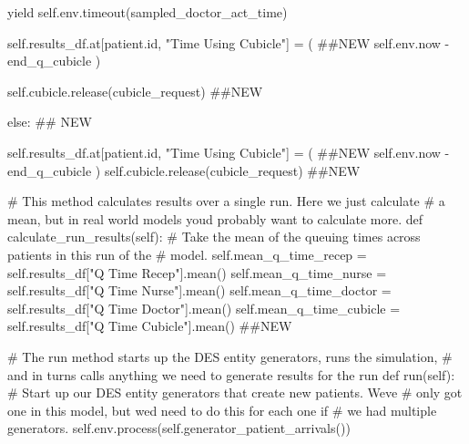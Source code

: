 \documentclass[
  letterpaper,
  DIV=11,
  numbers=noendperiod]{scrreprt}
\newenvironment{Shaded}{\begin{snugshade}}{\end{snugshade}}
\newcommand{\BuiltInTok}[1]{\textcolor[rgb]{0.00,0.23,0.31}{#1}}
\newcommand{\CommentTok}[1]{\textcolor[rgb]{0.37,0.37,0.37}{#1}}
\newcommand{\ControlFlowTok}[1]{\textcolor[rgb]{0.00,0.23,0.31}{#1}}
\newcommand{\KeywordTok}[1]{\textcolor[rgb]{0.00,0.23,0.31}{#1}}
\newcommand{\NormalTok}[1]{\textcolor[rgb]{0.00,0.23,0.31}{#1}}
\newcommand{\OperatorTok}[1]{\textcolor[rgb]{0.37,0.37,0.37}{#1}}
\newcommand{\StringTok}[1]{\textcolor[rgb]{0.13,0.47,0.30}{#1}}
\newcommand{\VariableTok}[1]{\textcolor[rgb]{0.07,0.07,0.07}{#1}}
\begin{document}
\begin{tcolorbox}
\begin{Shaded}
\begin{Highlighting}[]
                \ControlFlowTok{yield} \VariableTok{self}\NormalTok{.env.timeout(sampled\_doctor\_act\_time)}

                \VariableTok{self}\NormalTok{.results\_df.at[patient.}\BuiltInTok{id}\NormalTok{, }\StringTok{"Time Using Cubicle"}\NormalTok{] }\OperatorTok{=}\NormalTok{ ( }\CommentTok{\#\#NEW}
                    \VariableTok{self}\NormalTok{.env.now }\OperatorTok{{-}}\NormalTok{ end\_q\_cubicle}
\NormalTok{                )}

                \VariableTok{self}\NormalTok{.cubicle.release(cubicle\_request) }\CommentTok{\#\#NEW}

        \ControlFlowTok{else}\NormalTok{: }\CommentTok{\#\# NEW}

            \VariableTok{self}\NormalTok{.results\_df.at[patient.}\BuiltInTok{id}\NormalTok{, }\StringTok{"Time Using Cubicle"}\NormalTok{] }\OperatorTok{=}\NormalTok{ (  }\CommentTok{\#\#NEW}
                  \VariableTok{self}\NormalTok{.env.now }\OperatorTok{{-}}\NormalTok{ end\_q\_cubicle}
\NormalTok{                  )}
            \VariableTok{self}\NormalTok{.cubicle.release(cubicle\_request) }\CommentTok{\#\#NEW}


    \CommentTok{\# This method calculates results over a single run.  Here we just calculate}
    \CommentTok{\# a mean, but in real world models you\textquotesingle{}d probably want to calculate more.}
    \KeywordTok{def}\NormalTok{ calculate\_run\_results(}\VariableTok{self}\NormalTok{):}
        \CommentTok{\# Take the mean of the queuing times across patients in this run of the}
        \CommentTok{\# model.}
        \VariableTok{self}\NormalTok{.mean\_q\_time\_recep }\OperatorTok{=} \VariableTok{self}\NormalTok{.results\_df[}\StringTok{"Q Time Recep"}\NormalTok{].mean()}
        \VariableTok{self}\NormalTok{.mean\_q\_time\_nurse }\OperatorTok{=} \VariableTok{self}\NormalTok{.results\_df[}\StringTok{"Q Time Nurse"}\NormalTok{].mean()}
        \VariableTok{self}\NormalTok{.mean\_q\_time\_doctor }\OperatorTok{=} \VariableTok{self}\NormalTok{.results\_df[}\StringTok{"Q Time Doctor"}\NormalTok{].mean()}
        \VariableTok{self}\NormalTok{.mean\_q\_time\_cubicle }\OperatorTok{=} \VariableTok{self}\NormalTok{.results\_df[}\StringTok{"Q Time Cubicle"}\NormalTok{].mean() }\CommentTok{\#\#NEW}

    \CommentTok{\# The run method starts up the DES entity generators, runs the simulation,}
    \CommentTok{\# and in turns calls anything we need to generate results for the run}
    \KeywordTok{def}\NormalTok{ run(}\VariableTok{self}\NormalTok{):}
        \CommentTok{\# Start up our DES entity generators that create new patients.  We\textquotesingle{}ve}
        \CommentTok{\# only got one in this model, but we\textquotesingle{}d need to do this for each one if}
        \CommentTok{\# we had multiple generators.}
        \VariableTok{self}\NormalTok{.env.process(}\VariableTok{self}\NormalTok{.generator\_patient\_arrivals())}


\end{Highlighting}
\end{Shaded}
\end{tcolorbox}
\end{document}
